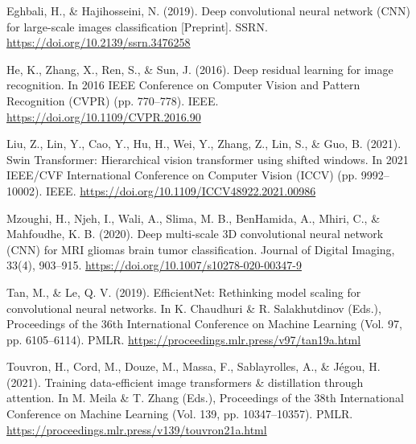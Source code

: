 \documentclass{article}
\begin{document}
\clearpage
\begingroup
\renewcommand{\bibsection}{\section*{References}}
\begin{thebibliography}{}

Eghbali, H., \& Hajihosseini, N. (2019).
Deep convolutional neural network (CNN) for large-scale images classification [Preprint].
SSRN. \url{https://doi.org/10.2139/ssrn.3476258}

He, K., Zhang, X., Ren, S., \& Sun, J. (2016). Deep residual learning for image recognition.
In 2016 IEEE Conference on Computer Vision and Pattern Recognition (CVPR) (pp. 770--778).
IEEE. \url{https://doi.org/10.1109/CVPR.2016.90}

Liu, Z., Lin, Y., Cao, Y., Hu, H., Wei, Y., Zhang, Z., Lin, S., \& Guo, B. (2021).
Swin Transformer: Hierarchical vision transformer using shifted windows.
In 2021 IEEE/CVF International Conference on Computer Vision (ICCV) (pp. 9992--10002).
IEEE. \url{https://doi.org/10.1109/ICCV48922.2021.00986}

Mzoughi, H., Njeh, I., Wali, A., Slima, M. B., BenHamida, A., Mhiri, C., \& Mahfoudhe, K. B. (2020).
Deep multi-scale 3D convolutional neural network (CNN) for MRI gliomas brain tumor classification.
Journal of Digital Imaging, 33(4), 903--915.
\url{https://doi.org/10.1007/s10278-020-00347-9}

Tan, M., \& Le, Q. V. (2019). EfficientNet: Rethinking model scaling for convolutional neural networks.
In K. Chaudhuri \& R. Salakhutdinov (Eds.), Proceedings of the 36th International Conference on Machine Learning
(Vol. 97, pp. 6105--6114). PMLR. \url{https://proceedings.mlr.press/v97/tan19a.html}

Touvron, H., Cord, M., Douze, M., Massa, F., Sablayrolles, A., \& J\'egou, H. (2021).
Training data-efficient image transformers \& distillation through attention.
In M. Meila \& T. Zhang (Eds.), Proceedings of the 38th International Conference on Machine Learning
(Vol. 139, pp. 10347--10357). PMLR. \url{https://proceedings.mlr.press/v139/touvron21a.html}

\end{thebibliography}
\endgroup
\end{document}
